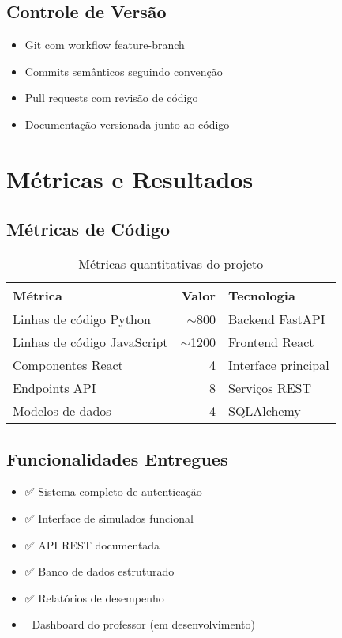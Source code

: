 \documentclass[12pt,a4paper]{article}
\begin{document}
\subsection{Controle de Versão}
\begin{itemize}
    \item Git com workflow feature-branch
    \item Commits semânticos seguindo convenção
    \item Pull requests com revisão de código
    \item Documentação versionada junto ao código
\end{itemize}

\section{Métricas e Resultados}

\subsection{Métricas de Código}
\begin{table}[H]
\centering
\begin{tabular}{|l|r|l|}
\hline
\textbf{Métrica} & \textbf{Valor} & \textbf{Tecnologia} \\
\hline
Linhas de código Python & $\sim$800 & Backend FastAPI \\
Linhas de código JavaScript & $\sim$1200 & Frontend React \\
Componentes React & 4 & Interface principal \\
Endpoints API & 8 & Serviços REST \\
Modelos de dados & 4 & SQLAlchemy \\
\hline
\end{tabular}
\caption{Métricas quantitativas do projeto}
\end{table}

\subsection{Funcionalidades Entregues}
\begin{itemize}
    \item ✅ Sistema completo de autenticação
    \item ✅ Interface de simulados funcional
    \item ✅ API REST documentada
    \item ✅ Banco de dados estruturado
    \item ✅ Relatórios de desempenho
    \item 🔄 Dashboard do professor (em desenvolvimento)
\end{itemize}
\end{document}
